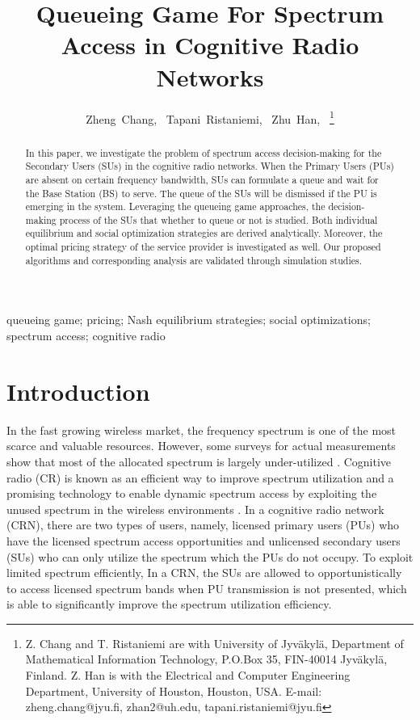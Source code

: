 \documentclass[journal]{IEEEtran}
\begin{document}
\title{Queueing Game For Spectrum Access in Cognitive
Radio Networks}
\author{Zheng~Chang,~
 Tapani~Ristaniemi,~
Zhu~Han,~
\thanks{Z. Chang and T. Ristaniemi are with University of Jyv\"akyl\"a, Department of Mathematical Information Technology, P.O.Box 35, FIN-40014 Jyv\"akyl\"a, Finland.
Z. Han is with the Electrical and Computer Engineering Department,
University of Houston, Houston, USA.
E-mail: zheng.chang@jyu.fi, zhan2@uh.edu, tapani.ristaniemi@jyu.fi}}

\maketitle

\begin{abstract}
In this paper, we investigate the problem of spectrum access
decision-making for the Secondary Users (SUs) in the cognitive radio
networks. When the Primary Users (PUs) are absent on certain frequency
bandwidth, SUs can formulate a queue and wait for the Base Station
(BS) to serve. The queue of the SUs will be dismissed if the PU is
emerging in the system. Leveraging the queueing game approaches,
the decision-making process of the SUs that whether to queue or not is
studied. Both individual equilibrium and social optimization
strategies are derived analytically. Moreover, the optimal pricing
strategy of the service provider is investigated as well. Our
proposed algorithms and corresponding analysis are validated
through simulation studies.
\end{abstract}

\begin{IEEEkeywords}
queueing game; pricing; Nash equilibrium strategies; social
optimizations; spectrum access; cognitive radio
\end{IEEEkeywords}

\section{Introduction}
\label{Sec1}

In the fast growing wireless market, the frequency spectrum is one
of the most scarce and valuable resources. However, some surveys
for actual measurements show that most of the allocated spectrum is largely under-utilized \cite{Hossain}. Cognitive radio (CR)
is known as an efficient way to improve spectrum utilization and a
promising technology to enable dynamic spectrum access by
exploiting the unused spectrum in the wireless environments
\cite{Hossain}. In a cognitive radio network (CRN), there are two
types of users, namely, licensed primary users (PUs) who have the licensed spectrum access opportunities and unlicensed
secondary users (SUs) who can only utilize the spectrum which the PUs do not occupy. To exploit limited spectrum efficiently, In a CRN, the SUs are allowed to opportunistically to access licensed
spectrum bands when PU transmission is not presented, which is
able to significantly improve the spectrum utilization efficiency.
\par
\end{document}
